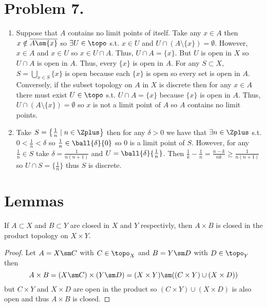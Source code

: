 \documentclass[12pt]{extarticle}
\begin{document}
\section*{Problem 7.}
\begin{enumerate}
\item Suppose that $A$ contains no limit points of itself. Take any $x \in A$ then $x \notin \overline{A \sm \{x \}}$ so $\exists U \in \topo$ s.t. $x \in U$ and $U \cap (A \setminus \{x \}) = \emptyset$. However, $x \in A$ and $x \in U$ so $x \in U \cap A$. Thus, $U \cap A = \{x \}$. But $U$ is open in $X$ so $U \cap A$ is open in $A$. Thus, every $\{x \}$ is open in $A$. For any $S \subset X$, $S = \bigcup\limits_{x \in S} \{x\}$ is open because each $\{x\}$ is open so every set is open in $A$. Conversely, if the subset topology on $A$ in $X$ is discrete then for any $x \in A$ there  must exist $U \in \topo$ s.t. $U \cap A = \{x\}$ because $\{x\}$ is open in $A$. Thus, $U \cap (A \setminus \{x \}) = \emptyset$ so $x$ is not a limit point of $A$ so $A$ contains no limit points. 
    
\item Take $S = \left\{ \frac{1}{n} \mid n \in \Zplus \right \}$ then for any $\delta > 0$ we have that $\exists n \in \Zplus$ s.t. $0 < \frac{1}{n} < \delta$ so $\frac{1}{n} \in \ball{\delta}{0}$ so $0$ is a limit point of $S$. However, for any $\frac{1}{n} \in S$ take $\delta = \frac{1}{n(n+1)}$ and $U = \ball{\delta}{\frac{1}{n}}$. Then $\frac{1}{k} - \frac{1}{n} = \frac{n - k}{nk} \ge \frac{1}{n(n+1)}$ so $U \cap S = \{\frac{1}{n}\}$ thus $S$ is discrete. 
\end{enumerate}

\section*{Lemmas}

\begin{lemma} \label{closedprods}
If $A \subset X$ and $B \subset Y$ are closed in $X$ and $Y$ respectivly, then $A \times B$ is closed in the product topology on $X \times Y$.
\end{lemma}
\begin{proof}
Let $A = X \sm C$ with $C \in \topo_X$ and $B = Y \sm D$ with $D \in \topo_Y$ then \[A \times B = (X \sm C) \times (Y \sm D) = (X \times Y) \sm ((C \times Y) \cup (X \times D))\] but $C \times Y$ and $X \times D$ are open in the product so $(C \times Y) \cup (X \times D)$ is also open and thus $A \times B$ is closed. 
\end{proof}
\end{document}
